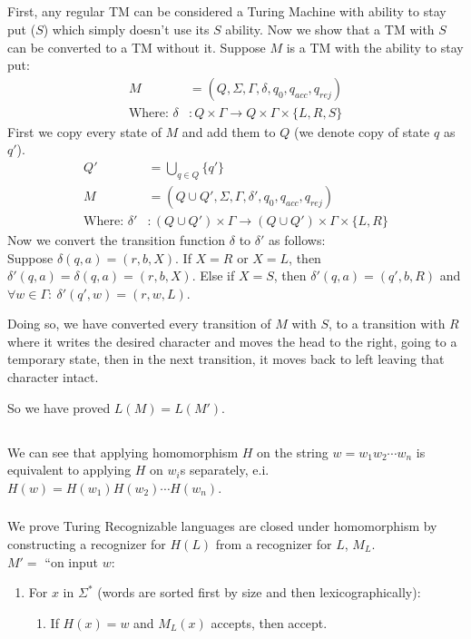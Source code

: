 \documentclass{article}
\begin{document}
\subsection{}
First, any regular TM can be considered a Turing Machine with ability to stay put (\(S\)) which simply doesn't use its \(S\) ability.
Now we show that a TM with \(S\) can be converted to a TM without it.
Suppose \(M\) is a TM with the ability to stay put:
\begin{align*}
M&=(Q, \Sigma, \Gamma, \delta, q_0, q_{acc}, q_{rej})\\
\text{Where: } \delta&: Q \times \Gamma \rightarrow Q \times \Gamma \times \{L, R, S\}
\end{align*}
First we copy every state of \(M\) and add them to \(Q\) (we denote copy of state \(q\) as \(q'\)).
\begin{align*}
Q'&= \bigcup_{q\in Q} \{q'\}\\
M&=(Q\cup Q', \Sigma, \Gamma, \delta', q_0, q_{acc}, q_{rej})\\
\text{Where: } \delta'&: (Q\cup Q') \times \Gamma \rightarrow (Q\cup Q') \times \Gamma \times \{L, R\}
\end{align*}
Now we convert the transition function \(\delta\) to \(\delta'\) as follows:\\
Suppose \(\delta(q, a) = (r, b, X)\).
If \(X=R\) or \(X=L\), then \(\delta'(q, a) =\delta(q, a) = (r, b, X)\).
Else if \(X=S\), then \(\delta'(q, a) = (q', b, R)\) and \(\forall w\in \Gamma:\ \delta'(q', w)=(r, w, L)\).

Doing so, we have converted every transition of \(M\) with \(S\), to a transition with \(R\) where it writes the desired character and moves the head to the right, going to a temporary state, then in the next transition, it moves back to left leaving that character intact.

So we have proved \(L(M)=L(M')\).

\subsection{}
We can see that applying homomorphism \(H\) on the string \(w=w_1w_2\cdots w_n\) is equivalent to applying \(H\) on \(w_i\)s separately, e.i. \(H(w)=H(w_1)H(w_2)\cdots H(w_n)\).
\subsubsection{}
We prove Turing Recognizable languages are closed under homomorphism by constructing a recognizer for \(H(L)\) from a recognizer for \(L\), \(M_L\).\\[7pt]
\(M' = \) ``on input \(w\):
\begin{enumerate}
\item For \(x\) in \(\Sigma^*\) (words are sorted first by size and then lexicographically):
\begin{enumerate}
\item[] If \(H(x)=w\) and \(M_L(x)\) accepts, then accept.
\end{enumerate}
\end{enumerate}
\end{document}
